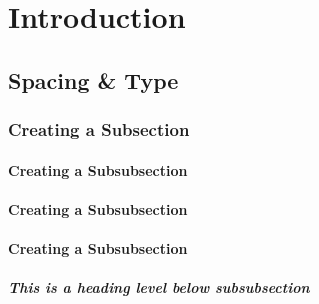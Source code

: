 \chapter{Introduction}
\label{chap:intro}
\section{Spacing \& Type}
\label{sec:section}


\subsection{Creating a Subsection}
\label{sec:subsection}

\subsubsection{Creating a Subsubsection}
\subsubsection{Creating a Subsubsection}
\subsubsection{Creating a Subsubsection}

\paragraph{This is a heading level below subsubsection}

